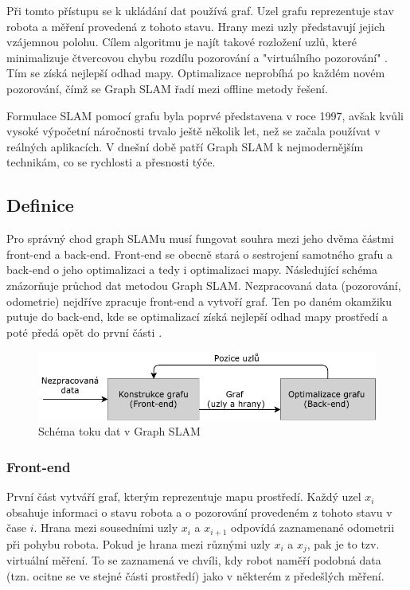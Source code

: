 \documentclass[12pt,a4paper]{article}
\begin{document}
Při tomto přístupu se k ukládání dat používá graf. Uzel grafu reprezentuje stav robota a měření provedená z tohoto stavu. Hrany mezi uzly představují jejich vzájemnou polohu. Cílem algoritmu je najít takové rozložení uzlů, které minimalizuje čtvercovou chybu rozdílu pozorování a "virtuálního pozorování" \cite{GraphSLAM}. Tím se získá nejlepší odhad mapy. Optimalizace neprobíhá po každém novém pozorování, čímž se Graph SLAM řadí mezi offline metody řešení.

Formulace SLAM pomocí grafu byla poprvé představena v roce 1997, avšak kvůli vysoké výpočetní náročnosti trvalo ještě několik let, než se začala používat v reálných aplikacích. V dnešní době patří Graph SLAM k nejmodernějším technikám, co se rychlosti a přesnosti týče.

\subsection{Definice}
Pro správný chod graph SLAMu musí fungovat souhra mezi jeho dvěma částmi front-end a back-end. Front-end se obecně stará o sestrojení samotného grafu a back-end o jeho optimalizaci a tedy i optimalizaci mapy. Následující schéma znázorňuje průchod dat metodou Graph SLAM. Nezpracovaná data (pozorování, odometrie) nejdříve zpracuje front-end a vytvoří graf. Ten po daném okamžiku putuje do back-end, kde se optimalizací získá nejlepší odhad mapy prostředí a poté předá opět do první části \cite{16-graph-slam}.

\begin{figure}[H]
\centering
\includegraphics[scale=1.2]{img/Obr3.pdf}
\caption{Schéma toku dat v Graph SLAM}
\end{figure}

\subsubsection{Front-end}
První část vytváří graf, kterým reprezentuje mapu prostředí. Každý uzel $x_i$ obsahuje informaci o stavu robota a o pozorování provedeném z tohoto stavu v čase $i$. Hrana mezi sousedními uzly $x_i$ a $x_{i+1}$ odpovídá zaznamenané odometrii při pohybu robota. Pokud je hrana mezi různými uzly $x_i$ a $x_j$, pak je to tzv. virtuální měření. To se zaznamená ve chvíli, kdy robot naměří podobná data (tzn. ocitne se ve stejné části prostředí) jako v některém z předešlých měření. 
\end{document}
